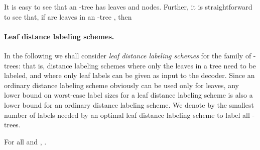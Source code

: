 It is easy to see that an -tree
has  leaves and  nodes.  Further, it is straightforward to see that, if  are leaves in an -tree , then


\paragraph{Leaf distance labeling schemes.}
In the following we shall consider \emph{leaf distance labeling schemes} for the family of -trees: that is, distance labeling schemes where only the leaves in a tree need to be labeled, and where only leaf labels can be given as input to the decoder. Since an ordinary distance labeling scheme obviously can be used only for leaves, any lower bound on worst-case label sizes for a leaf distance labeling scheme is also a lower bound for an ordinary distance labeling scheme. We denote by  the smallest number of labels needed by an optimal leaf distance labeling scheme to label all -trees.
\begin{lemma} \label{lemm:distancehM}
For all  and , .
\end{lemma}
